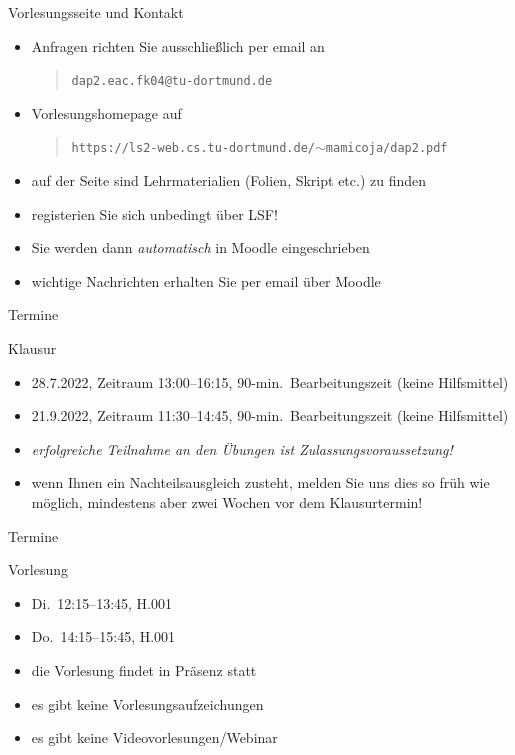 \documentclass[aspectratio=1610, 11pt]{beamer}
\begin{document}
\begin{frame}{Vorlesungsseite und Kontakt}
	\begin{exampleblock}{}
		\begin{itemize}
			\item Anfragen richten Sie ausschlie\ss lich per email an
				\begin{quote}
\tt dap2.eac.fk04@tu-dortmund.de
				\end{quote}
			\item Vorlesungshomepage auf
				\begin{quote}
\tt https://ls2-web.cs.tu-dortmund.de/$\sim$mamicoja/dap2.pdf
				\end{quote}
			\item auf der Seite sind Lehrmaterialien (Folien, Skript etc.) zu finden
			\item registerien Sie sich \alert{unbedingt} \"uber LSF!
			\item Sie werden dann \emph{automatisch} in \alert{Moodle} eingeschrieben
			\item wichtige Nachrichten erhalten Sie per email \"uber Moodle
		\end{itemize}
	\end{exampleblock}
\end{frame}


\begin{frame}{Termine}
	\begin{exampleblock}{Klausur}
		\begin{itemize}
			\item 28.7.2022, Zeitraum 13:00--16:15, 90-min.\ Bearbeitungszeit (keine Hilfsmittel)
			\item 21.9.2022, Zeitraum 11:30--14:45, 90-min.\ Bearbeitungszeit (keine Hilfsmittel)
			\item \emph{erfolgreiche Teilnahme an den \"Ubungen ist Zulassungsvoraussetzung!}
			\item wenn Ihnen ein Nachteilsausgleich zusteht, melden Sie uns dies so fr\"uh wie m\"oglich, mindestens aber zwei Wochen vor dem Klausurtermin!
		\end{itemize}
	\end{exampleblock}
\end{frame}

\begin{frame}{Termine}
	\begin{exampleblock}{Vorlesung}
		\begin{itemize}
			\item Di.\ 12:15--13:45, H.001
			\item Do.\ 14:15--15:45, H.001
			\item die Vorlesung findet in Pr\"asenz statt
			\item es gibt keine Vorlesungsaufzeichungen
			\item es gibt keine Videovorlesungen/Webinar
		\end{itemize}
	\end{exampleblock}
\end{frame}
\end{document}
